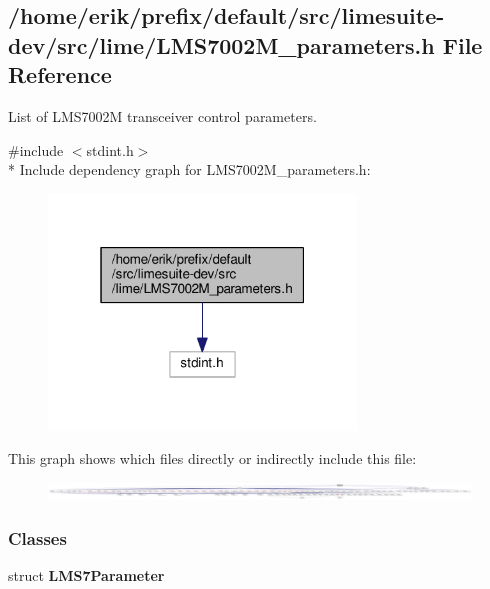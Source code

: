 \subsection{/home/erik/prefix/default/src/limesuite-\/dev/src/lime/\+L\+M\+S7002\+M\+\_\+parameters.h File Reference}
\label{LMS7002M__parameters_8h}


List of L\+M\+S7002M transceiver control parameters.  


{\ttfamily \#include $<$stdint.\+h$>$}\\*
Include dependency graph for L\+M\+S7002\+M\+\_\+parameters.\+h\+:
\nopagebreak
\begin{figure}[H]
\begin{center}
\leavevmode
\includegraphics[width=232pt]{d1/d07/LMS7002M__parameters_8h__incl}
\end{center}
\end{figure}
This graph shows which files directly or indirectly include this file\+:
\nopagebreak
\begin{figure}[H]
\begin{center}
\leavevmode
\includegraphics[width=350pt]{df/d8f/LMS7002M__parameters_8h__dep__incl}
\end{center}
\end{figure}
\subsubsection*{Classes}
\begin{DoxyCompactItemize}
\item 
struct {\bf L\+M\+S7\+Parameter}
\end{DoxyCompactItemize}
